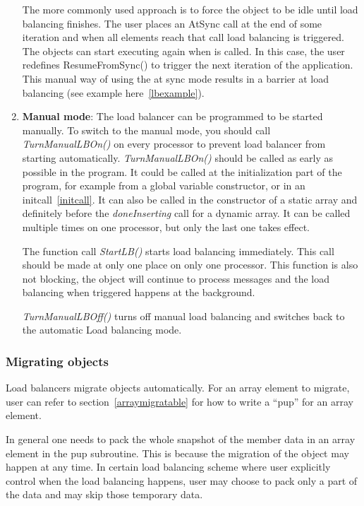 \begin{enumerate}
The more commonly used approach is to force the object to be idle until load
balancing finishes. The user places an AtSync call at the end of some iteration
and when all elements reach that call load balancing is triggered. The objects
can start executing again when  is called. In this case,
the user redefines ResumeFromSync() to trigger the next iteration of the
application. This manual way of using the at sync mode results in a barrier at
load balancing (see example here~\ref{lbexample}).
%
\item {\bf Manual mode}: The load balancer can be programmed to be started
manually. To switch to the manual mode, you should call {\em TurnManualLBOn()}
on every processor to prevent load balancer from starting automatically. {\em
TurnManualLBOn()} should be called as early as possible in the program. It
could be called at the initialization part of the program, for example from a
global variable constructor, or in an initcall~\ref{initcall}.  It can also be
called in the constructor of a static array and definitely before the {\em
doneInserting} call for a dynamic array.  It can be called multiple times on
one processor, but only the last one takes effect.

The function call {\em StartLB()} starts load balancing immediately. This call
should be made at only one place on only one processor. This function is also
not blocking, the object will continue to process messages and the load
balancing when triggered happens at the background.

{\em TurnManualLBOff()} turns off manual load balancing and switches back to
the automatic Load balancing mode.
%
\end{enumerate}

\subsubsection{Migrating objects}

\label{lbmigobj}

Load balancers migrate objects automatically.
For an array element to migrate, user can refer to section~\ref{arraymigratable}
for how to write a ``pup'' for an array element.

In general one needs to pack the whole snapshot of the member data in an 
array element in the pup subroutine. This is because the migration of
the object may happen at any time. In certain load balancing scheme where
user explicitly control when the load balancing happens, user may choose
to pack only a part of the data and may skip those temporary data.

